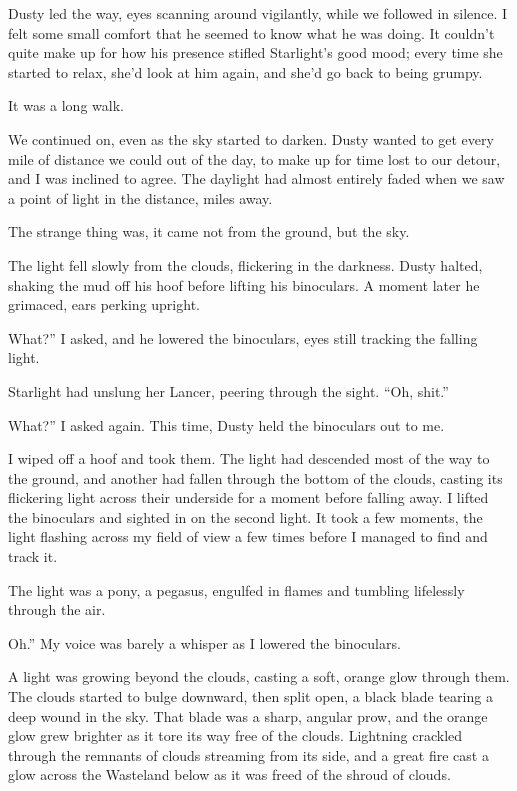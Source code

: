 Dusty led the way, eyes scanning around vigilantly, while we followed in silence. I felt some small comfort that he seemed to know what he was doing. It couldn’t quite make up for how his presence stifled Starlight’s good mood; every time she started to relax, she’d look at him again, and she’d go back to being grumpy.

It was a long walk.

We continued on, even as the sky started to darken. Dusty wanted to get every mile of distance we could out of the day, to make up for time lost to our detour, and I was inclined to agree. The daylight had almost entirely faded when we saw a point of light in the distance, miles away.

The strange thing was, it came not from the ground, but the sky.

The light fell slowly from the clouds, flickering in the darkness. Dusty halted, shaking the mud off his hoof before lifting his binoculars. A moment later he grimaced, ears perking upright.

\leavevmode{}What?” I asked, and he lowered the binoculars, eyes still tracking the falling light.

Starlight had unslung her Lancer, peering through the sight. “Oh, shit.”

\leavevmode{}What?” I asked again. This time, Dusty held the binoculars out to me.

I wiped off a hoof and took them. The light had descended most of the way to the ground, and another had fallen through the bottom of the clouds, casting its flickering light across their underside for a moment before falling away. I lifted the binoculars and sighted in on the second light. It took a few moments, the light flashing across my field of view a few times before I managed to find and track it.

The light was a pony, a pegasus, engulfed in flames and tumbling lifelessly through the air.

\leavevmode{}Oh.” My voice was barely a whisper as I lowered the binoculars.

A light was growing beyond the clouds, casting a soft, orange glow through them. The clouds started to bulge downward, then split open, a black blade tearing a deep wound in the sky. That blade was a sharp, angular prow, and the orange glow grew brighter as it tore its way free of the clouds. Lightning crackled through the remnants of clouds streaming from its side, and a great fire cast a glow across the Wasteland below as it was freed of the shroud of clouds.

